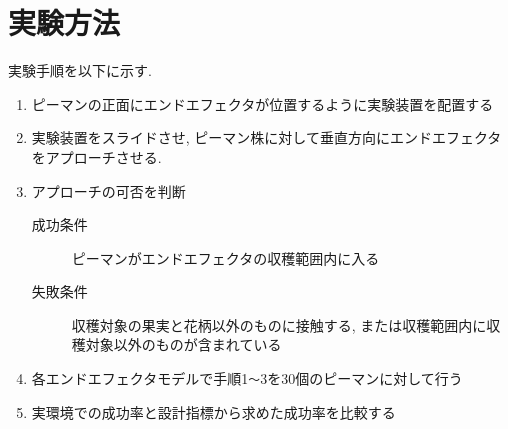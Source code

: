 \section{実験方法}
実験手順を以下に示す.
\begin{enumerate}
  \item ピーマンの正面にエンドエフェクタが位置するように実験装置を配置する
  \item 実験装置をスライドさせ, ピーマン株に対して垂直方向にエンドエフェクタをアプローチさせる.
  \item アプローチの可否を判断
  \begin{description}
    \item[成功条件] ピーマンがエンドエフェクタの収穫範囲内に入る
    \item[失敗条件] 収穫対象の果実と花柄以外のものに接触する, または収穫範囲内に収穫対象以外のものが含まれている
  \end{description}
  \item 各エンドエフェクタモデルで手順1\verb|〜|3を30個のピーマンに対して行う
  \item 実環境での成功率と設計指標から求めた成功率を比較する
\end{enumerate}